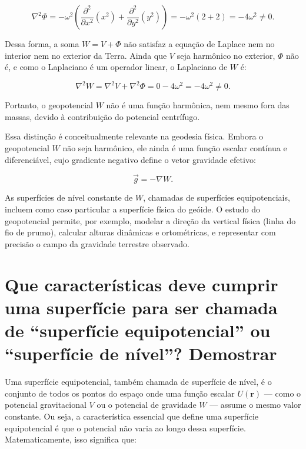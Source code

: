 \[
\nabla^2 \Phi = -\omega^2 \left( \frac{\partial^2}{\partial x^2} (x^2) + \frac{\partial^2}{\partial y^2} (y^2) \right) = -\omega^2 (2 + 2) = -4\omega^2 \neq 0 \text{.}
\]

Dessa forma, a soma \( W = V + \Phi \) não satisfaz a equação de Laplace nem no interior nem no exterior da Terra. Ainda que \( V \) seja harmônico no exterior, \( \Phi \) não é, e como o Laplaciano é um operador linear, o Laplaciano de \( W \) é:

\[
\nabla^2 W = \nabla^2 V + \nabla^2 \Phi = 0 - 4\omega^2 = -4\omega^2 \neq 0 \text{.}
\]

Portanto, o geopotencial \( W \) não é uma função harmônica, nem mesmo fora das massas, devido à contribuição do potencial centrífugo.

Essa distinção é conceitualmente relevante na geodesia física. Embora o geopotencial \( W \) não seja harmônico, ele ainda é uma função escalar contínua e diferenciável, cujo gradiente negativo define o vetor gravidade efetivo:

\[
\vec{g} = -\nabla W \text{.}
\]

As superfícies de nível constante de \( W \), chamadas de superfícies equipotenciais, incluem como caso particular a superfície física do geóide. O estudo do geopotencial permite, por exemplo, modelar a direção da vertical física (linha do fio de prumo), calcular alturas dinâmicas e ortométricas, e representar com precisão o campo da gravidade terrestre observado.


\section{Que características deve cumprir uma superfície para ser chamada de “superfície equipotencial” ou “superfície de nível”? Demostrar}

Uma superfície equipotencial, também chamada de superfície de nível, é o conjunto de todos os pontos do espaço onde uma função escalar \( U(\mathbf{r}) \) — como o potencial gravitacional \( V \) ou o potencial de gravidade \( W \) — assume o mesmo valor constante. Ou seja, a característica essencial que define uma superfície equipotencial é que o potencial não varia ao longo dessa superfície. Matematicamente, isso significa que:

